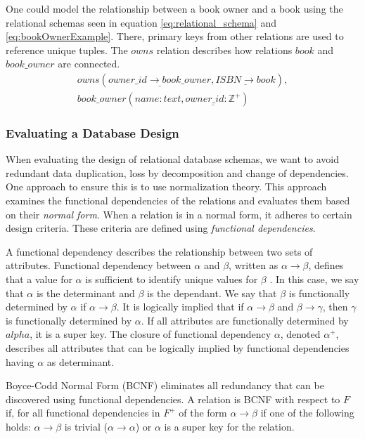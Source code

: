 One could model the relationship between a book owner and a book using the relational schemas seen in equation \ref{eq:relational_schema} and \ref{eq:bookOwnerExample}.
There, primary keys from other relations are used to reference unique tuples. The $owns$ relation describes how relations $book$ and $book\_owner$ are connected. 
\begin{equation}\label{eq:bookOwnerExample}
    \begin{split}
        owns(\underline{owner\_id \rightarrow book\_owner}, \underline{ISBN \rightarrow book}), \\
        book\_owner(name:text,\underline{owner\_id:\mathbb{Z}^+})
    \end{split}
\end{equation}

\subsubsection*{Evaluating a Database Design}
When evaluating the design of relational database schemas, we want to avoid redundant data duplication, loss by decomposition and change of dependencies\cite{DBSBook}.
One approach to ensure this is to use normalization theory\cite{DBSBook}. 
This approach examines the functional dependencies of the relations and evaluates them based on their \textit{normal form}.
When a relation is in a normal form, it adheres to certain design criteria. 
These criteria are defined using \textit{functional dependencies}.

A functional dependency describes the relationship between two sets of attributes. 
Functional dependency between $\alpha$ and $\beta$, written as $\alpha \rightarrow \beta$, defines that a value for $\alpha$ is sufficient to identify unique values for $\beta$ \cite{DBSBook}.
In this case, we say that $\alpha$ is the determinant and $\beta$ is the dependant. 
We say that $\beta$ is functionally determined by $\alpha$ if $\alpha \rightarrow \beta$.
It is logically implied that if $\alpha \rightarrow \beta$ and $\beta \rightarrow \gamma$, then $\gamma$ is functionally determined by $\alpha$.
If all attributes are functionally determined by $alpha$, it is a super key\cite{DBSBook}.
The closure of functional dependency $\alpha$, denoted $\alpha^+$, describes all attributes that can be logically implied by functional dependencies having $\alpha$ as determinant\cite{DBSBook}. 

Boyce-Codd Normal Form (BCNF) eliminates all redundancy that can be discovered using functional dependencies\cite{DBSBook}. 
A relation is BCNF with respect to $F$ if, for all functional dependencies in $F^+$ of the form $\alpha \rightarrow \beta$ if one of the following holds:
$\alpha \rightarrow \beta$ is trivial ($\alpha \rightarrow \alpha$) or $\alpha$ is a super key for the relation.

